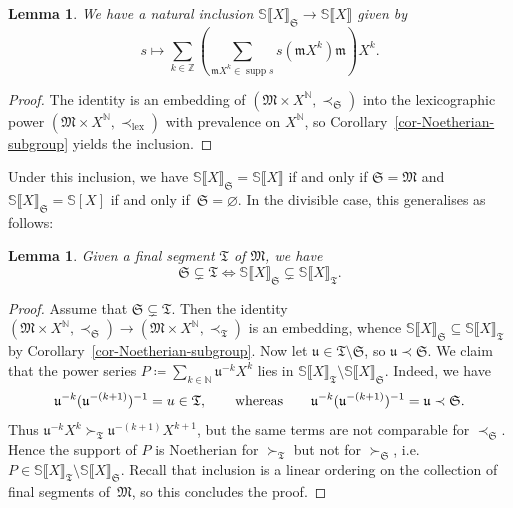 \documentclass{article}
\newcommand{\assign}{\coloneqq}
\newcommand{\tmop}[1]{\ensuremath{\operatorname{#1}}}
\newtheorem{lemma}[theorem]{Lemma}
\theoremstyle{remark}\newtheorem*{convention*}{Convention}
\begin{document}
\begin{lemma}
  We have a natural inclusion $\mathbb{S} \llbracket X
  \rrbracket_{\mathfrak{S}} \longrightarrow \mathbb{S} \llbracket X
  \rrbracket$ given by
  \[ s \mapsto \sum_{k \in \mathbb{Z}} \left( \sum_{\mathfrak{m}X^k \in
     \tmop{supp} s} s (\mathfrak{m}X^k)\mathfrak{m} \right) X^k . \]
\end{lemma}

\begin{proof}
  The identity is an embedding of $(\mathfrak{M} \times X^{\mathbb{N}},
  \prec_{\mathfrak{S}})$ into the lexicographic power $(\mathfrak{M} \times
  X^{\mathbb{N}}, \prec_{\tmop{lex}})$ with prevalence on $X^{\mathbb{N}}$, so
  Corollary~\ref{cor-Noetherian-subgroup} yields the inclusion.
\end{proof}

Under this inclusion, we have $\mathbb{S} \llbracket X
\rrbracket_{\mathfrak{S}} =\mathbb{S} \llbracket X \rrbracket$ if and only if
$\mathfrak{S}=\mathfrak{M}$ and $\mathbb{S} \llbracket X
\rrbracket_{\mathfrak{S}} =\mathbb{S} [X]$ if and only if~$\mathfrak{S}=
\varnothing$. In the divisible case, this generalises as follows:

\begin{lemma}
  \label{lem-increasing-cuts}Given a final segment $\mathfrak{T}$ of
  $\mathfrak{M}$, we have
  \[ \mathfrak{S} \subsetneq \mathfrak{T} \Longleftrightarrow \mathbb{S}
     \llbracket X \rrbracket_{\mathfrak{S}} \subsetneq \mathbb{S} \llbracket X
     \rrbracket_{\mathfrak{T}} . \]
\end{lemma}

\begin{proof}
  Assume that $\mathfrak{S} \subsetneq \mathfrak{T}$. Then the identity $(\mathfrak{M} \times X^{\mathbb{N}}, \prec_{\mathfrak{S}})
  \longrightarrow (\mathfrak{M} \times X^{\mathbb{N}}, \prec_{\mathfrak{T}})$ is an
  embedding,
  whence $\mathbb{S} \llbracket X \rrbracket_{\mathfrak{S}} \subseteq
  \mathbb{S} \llbracket X \rrbracket_{\mathfrak{T}}$ by
  Corollary~\ref{cor-Noetherian-subgroup}. Now let $\mathfrak{u} \in \mathfrak{T}
  \setminus \mathfrak{S}$, so $\mathfrak{u} \prec \mathfrak{S}$. We claim that
  the power series $P \assign \sum_{k \in \mathbb{N}} \mathfrak{u}^{- k} X^k$
  lies in $\mathbb{S} \llbracket X \rrbracket_{\mathfrak{T}} \setminus
  \mathbb{S} \llbracket X \rrbracket_{\mathfrak{S}}$. Indeed, we have
  \[ \mathfrak{u}^{- k}  (\mathfrak{u}^{- (k + 1)})^{- 1} = u \in
     \mathfrak{T}, \text{\qquad whereas\qquad$\mathfrak{u}^{- k} 
     (\mathfrak{u}^{- (k + 1)})^{- 1} =\mathfrak{u} \prec \mathfrak{S}$} . \]
  Thus $\mathfrak{u}^{- k} X^k \succ_{\mathfrak{T}} \mathfrak{u}^{- (k + 1)}
  X^{k + 1}$, but the same terms are not comparable for
  $\prec_{\mathfrak{S}}$. Hence the support of $P$ is Noetherian for
  $\succ_{\mathfrak{T}}$ but not for $\succ_{\mathfrak{S}}$, i.e. $P \in
  \mathbb{S} \llbracket X \rrbracket_{\mathfrak{T}} \setminus \mathbb{S}
  \llbracket X \rrbracket_{\mathfrak{S}}$. Recall that inclusion is a linear
  ordering on the collection of final segments of~$\mathfrak{M}$, so this
  concludes the proof.
\end{proof}
\end{document}
